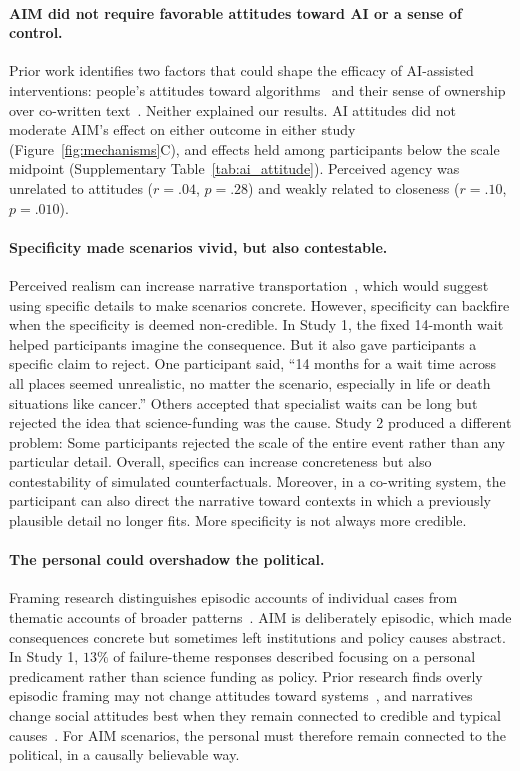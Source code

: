 \documentclass[11pt]{article}
\begin{document}
\paragraph{AIM did not require favorable attitudes toward AI or a sense of control.} Prior work identifies two factors that could shape the efficacy of AI-assisted interventions: people's attitudes toward algorithms~\citep{dietvorst_algorithm_2015} and their sense of ownership over co-written text~\citep{draxler_ai_2024}. Neither explained our results. AI attitudes did not moderate AIM's effect on either outcome in either study (Figure~\ref{fig:mechanisms}C), and effects held among participants below the scale midpoint (Supplementary Table~\ref{tab:ai_attitude}). Perceived agency was unrelated to attitudes ($r=.04$, $p=.28$) and weakly related to closeness ($r=.10$, $p=.010$).

\paragraph{Specificity made scenarios vivid, but also contestable.} Perceived realism can increase narrative transportation~\citep{green_transportation_2004}, which would suggest using specific details to make scenarios concrete. However, specificity can backfire when the specificity is deemed non-credible. In Study 1, the fixed 14-month wait helped participants imagine the consequence. But it also gave participants a specific claim to reject. One participant said, ``14 months for a wait time across all places seemed unrealistic, no matter the scenario, especially in life or death situations like cancer.'' Others accepted that specialist waits can be long but rejected the idea that science-funding was the cause. Study 2 produced a different problem: Some participants rejected the scale of the entire event rather than any particular detail. Overall, specifics can increase concreteness but also contestability of simulated counterfactuals.  Moreover, in a co-writing system, the participant can also direct the narrative toward contexts in which a previously plausible detail no longer fits. More specificity is not always more credible.


\paragraph{The personal could overshadow the political.} Framing research distinguishes episodic accounts of individual cases from thematic accounts of broader patterns~\citep{iyengar_is_1994,hart_one_2011}. AIM is deliberately episodic, which made consequences concrete but sometimes left institutions and policy causes abstract. In Study 1, $13\%$ of failure-theme responses described focusing on a personal predicament rather than science funding as policy. Prior research finds overly episodic framing may not change attitudes toward systems~\cite{iyengar_is_1994}, and narratives change social attitudes best when they remain connected to credible and typical causes~\cite{polletta_when_2020}. For AIM scenarios, the personal must therefore remain connected to the political, in a causally believable way.
\end{document}
